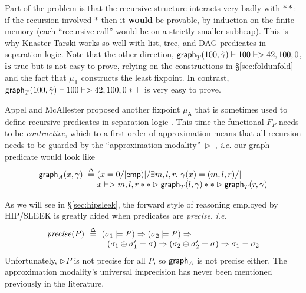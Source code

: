 Part of the problem is that the recursive structure interacts very badly with $**$: if the recursion involved $*$ then it \textbf{would} be provable, by induction on the finite memory (each ``recursive call'' would be on a strictly smaller subheap).  This is why Knaster-Tarski works so well with list, tree, and DAG predicates in separation logic.  Note that the other direction, \mbox{$\mathsf{graph}_T(100,\hat{\gamma}) |- 100 |-> 42,100,0$},
\textbf{is} true but is not easy to prove, relying on the constructions in \S\ref{sec:foldunfold} and the fact that $\mu_{\mathsf{T}}$ constructs the least fixpoint.  In contrast, $\mathsf{graph}_T(100,\hat{\gamma}) |- 100 |-> 42,100,0 * \top$ is very easy to prove. %





Appel and McAllester proposed another fixpoint $\mu_{\mathsf{A}}$
that is sometimes used to define recursive predicates in separation
logic \cite{appel:fixpoint}.  This time the functional $F_P$ needs to be
\emph{contractive}, which to a first order of approximation means that
all recursion needs to be guarded by the ``approximation
modality''~$\rhd$~\cite{appel:vmm}, \emph{i.e.} our graph predicate would
look like
\[
\begin{array}{@{}l@{}l@{}}
\grapham(x, \gamma) ~ \stackrel{\Delta}{=} ~ & (x = 0 /| \p{emp}) |/ \exists m,l,r.~ \gamma(x)=(m,l,r) /| \null \\
& x |-> m,l,r ** \rhd \graphkt(l, \gamma) ** \rhd \graphkt(r, \gamma)
\end{array}
\]

As we will see in \S\ref{sec:hipsleek}, the forward style of reasoning employed by
HIP/SLEEK is greatly aided when predicates are \emph{precise}, \emph{i.e.}
\[
\begin{array}{@{}l@{}l@{}}
\m{precise}(P) ~~ \defeq ~~ & (\sigma_1 |= P) => (\sigma_2 |= P) => \\
& ~~ (\sigma_1 \oplus \sigma_1' = \sigma) => (\sigma_2 \oplus \sigma_2' = \sigma) => \sigma_1 = \sigma_2
\end{array}
\]
Unfortunately, $\rhd P$ is not precise for all $P$, so $\mathsf{graph}_A$ is not precise either.  The approximation modality's universal imprecision has never been mentioned previously in the literature.  %

